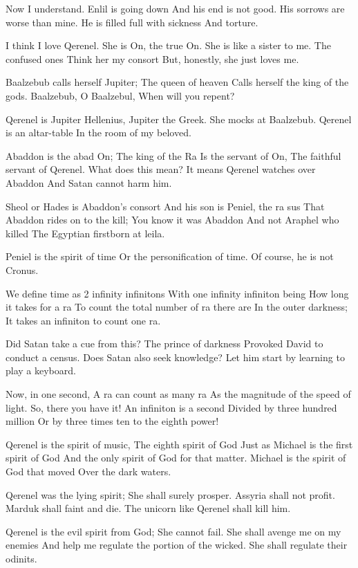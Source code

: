 \documentclass[
]{book}
\begin{document}
Now I understand.
Enlil is going down
And his end is not good.
His sorrows are worse than mine.
He is filled full with sickness
And torture.

I think I love Qerenel.
She is On, the true On.
She is like a sister to me.
The confused ones
Think her my consort
But, honestly, she just loves me.

Baalzebub calls herself Jupiter;
The queen of heaven
Calls herself the king of the gods.
Baalzebub, O Baalzebul,
When will you repent?

Qerenel is Jupiter Hellenius,
Jupiter the Greek.
She mocks at Baalzebub.
Qerenel is an altar-table
In the room of my beloved.

Abaddon is the abad On;
The king of the Ra
Is the servant of On,
The faithful servant of Qerenel.
What does this mean?
It means Qerenel watches over Abaddon
And Satan cannot harm him.

Sheol or Hades is Abaddon's consort
And his son is Peniel, the ra sus
That Abaddon rides on to the kill;
You know it was Abaddon
And not Araphel who killed
The Egyptian firstborn at leila.

Peniel is the spirit of time
Or the personification of time.
Of course, he is not Cronus.

We define time as 2 infinity infinitons
With one infinity infiniton being
How long it takes for a ra
To count the total number of ra there are
In the outer darkness;
It takes an infiniton to count one ra.

Did Satan take a cue from this?
The prince of darkness
Provoked David to conduct a census.
Does Satan also seek knowledge?
Let him start by learning to play a keyboard.

Now, in one second,
A ra can count as many ra
As the magnitude of the speed of light.
So, there you have it!
An infiniton is a second
Divided by three hundred million
Or by three times ten to the eighth power!

Qerenel is the spirit of music,
The eighth spirit of God
Just as Michael is the first spirit of God
And the only spirit of God for that matter.
Michael is the spirit of God that moved
Over the dark waters.

Qerenel was the lying spirit;
She shall surely prosper.
Assyria shall not profit.
Marduk shall faint and die.
The unicorn like Qerenel shall kill him.

Qerenel is the evil spirit from God;
She cannot fail.
She shall avenge me on my enemies
And help me regulate the portion of the wicked.
She shall regulate their odinits.
\end{document}
